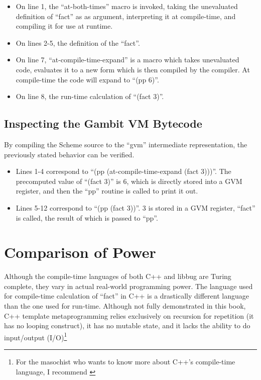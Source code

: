  \begin{itemize}
   \item
      On line 1, the ``at-both-times'' macro is invoked, taking the unevaluated
      definition of ``fact'' as
      as argument, interpreting it at compile-time, and compiling it for use at runtime.
   \item
      On lines 2-5, the definition of the ``fact''.
   \item
      On line 7, ``at-compile-time-expand'' is a macro which takes unevaluated code,
      evaluates it to a new form which is then compiled by the compiler.  At compile-time the code
      will expand to ``(pp 6)''.
   \item
      On line 8, the run-time calculation of ``(fact 3)''.
 \end{itemize}

 \subsection{Inspecting the Gambit VM Bytecode}
 By compiling the Scheme source to the ``gvm'' intermediate
 representation, the previously stated behavior can be verified.


 \begin{itemize}
   \item
      Lines 1-4 correspond to ``(pp (at-compile-time-expand (fact 3)))''.  The precomputed
      value of ``(fact 3)'' is 6, which is directly stored into a GVM register, and
      then the ``pp'' routine is called to print it out.
   \item
      Lines 5-12 correspond to ``(pp (fact 3))''.  3 is stored in a GVM register, ``fact''
      is called, the result of which is passed to ``pp''.
 \end{itemize}

 \section{Comparison of Power}

 Although the compile-time languages of both C++ and libbug are Turing complete,
 they vary in actual real-world programming power.  The language used
 for compile-time calculation of ``fact'' in C++ is a drastically different language than
 the one used for run-time.  Although not fully demonstrated in this book,
 C++ template metaprogramming relies exclusively on recursion for repetition (it has no
 looping construct), it has no mutable state, and it lacks the ability to do input/output
 (I/O)\footnote{For the masochist who wants to know more about C++'s compile-time language,
 I recommend \cite{ctm} }

